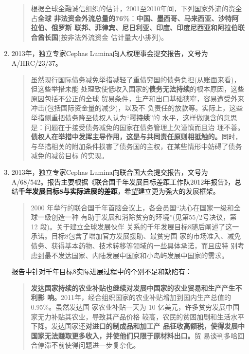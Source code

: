 \begin{enumerate}
\begin{quotation}
    根据全球金融诚信组织的估计，2001至2010年间，下列国家外流的资金占\textbf{全球
      非法资金外流总量的76\%}：\textbf{中国、墨西哥、马来西亚、沙特阿拉伯、俄罗斯
      联邦、菲律宾、尼日利亚、印度、印度尼西亚和阿拉伯联合酋长国}(按非法外流资金
    估计量大小排列)。
\end{quotation}

\item 2013年，独立专家Cephas Lumina向人权理事会提交报告，文号为A/HRC/23/37。

  \begin{quotation}
    虽然现行国际债务减免举措减轻了重债穷国的债务负担(从账面来看)，但这些举措未能
    处理致使低收入国家的\textbf{债务无法持续}的根本原因，这些原因包括不公正的全球
    贸易条件，生产和出口基础狭窄，容易遭受外来冲击(包括国际资金量的减少)，以及不
    负责任的放款等。实际上，这些举措侧重把债务降至债权人认为“\textbf{可持续}”的
    水平，这样做隐含的意思是：问题在于接受债务减免的国家在债务管理上欠谨慎而且治
    理不善。\textbf{债权人在举措中发挥主导作用，这是与共同责任原则相抵触的。}同时，
    与举措相关的附加条件损害了债务国的主权，在某些情形中妨碍了债务减免的减贫目标
    的实现。
  \end{quotation}

\item 2013年，独立专家Cephas Lumina向联合国大会提交报告，文号为 A/68/542。报告主要根据《联合国千年发展目标差距工作队2012年报告》，总结\textbf{千年发展目标8与实际进展的差距}，希望建立更为强大的发展框架。

  \begin{quotation}
    2000 年举行的联合国千年首脑会议上，各会员国“决心在国家一级和全球一级创造一种
    有助于发展和消除贫穷的环境”(见第55/2号决议，第 12 段)。关于建立全球发展伙伴
    关系的千年发展目标8随后阐述了这一承诺。目标8包含了增加官方发展援助、最贫穷国
    家的市场准入、减免债务、获得基本药物、技术转移等领域的一些具体承诺，而且应特
    别考虑到最不发达国家、内陆发展中国家和小岛屿发展中国家的需求。
  \end{quotation}

  报告中针对千年目标8实际进展过程中的个别不足和缺陷有：
  \begin{quotation}
    \textbf{发达国家持续的农业补贴也继续对发展中国家的农业贸易和生产产生不利影
      响。}2011年，经合组织国家的农业补贴增加到国内生产总值的 0.95\%。虽然发达国
    家农业补贴一天为 10 亿美元，许多贫穷发展中国家无力补贴其农业，导致其产品价格
    较高，农民的贫困加剧和生活水平下降。发达国家还\textbf{对进口的制成品和加工产
      品征收高额税，使得发展中国家无法赚取更多收入，并使他们只限于原材料出口。}贸
    易谈判多哈回合停滞不前使得问题进一步复杂化。


\end{quotation}
\end{enumerate}
